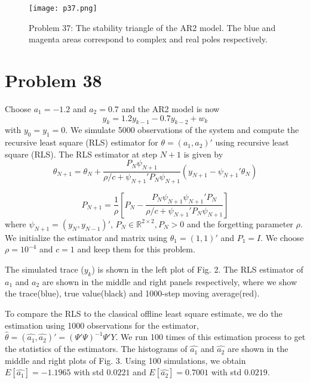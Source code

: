 \documentclass[a4paper, 11pt]{article}
\begin{document}
\begin{figure}
	\begin{center}
		\texttt{[image: p37.png]}
		\caption{Problem 37: The stability triangle of the AR2 model. The blue and magenta areas correspond to complex and real poles respectively.}
	\end{center}
\end{figure}



\section*{Problem 38}
Choose $a_1 = -1.2$ and $a_2=0.7$ and the AR2 model is now
\begin{equation}
y_k = 1.2y_{k-1} - 0.7y_{k-2} + w_k
\end{equation}
with $y_0 = y_1 = 0$. We simulate 5000 observations of the system and compute the recursive least square (RLS) estimator for $\theta = (a_1, a_2)'$ using recursive least square (RLS). The RLS estimator at step $N+1$ is given by  
\begin{equation}
\theta_{N+1} = \theta_N + \frac{P_N\psi_{N+1}}{\rho/c + \psi_{N+1}'P_N\psi_{N+1}}(y_{N+1} - \psi_{N+1}'\theta_N)
\end{equation}

\begin{equation}
P_{N+1} = \frac{1}{\rho}\left[P_N - \frac{P_N\psi_{N+1}\psi_{N+1}'P_N}{\rho/c + \psi_{N+1}'P_N\psi_{N+1}} \right]
\end{equation}
where $\psi_{N+1} = (y_N, y_{N-1})'$, $P_N \in \mathbb{R}^{2\times 2}, P_N >0$ and the forgetting parameter $\rho$. We initialize the estimator and matrix using $\theta_1 = (1, 1)'$ and $P_1 = I$. We choose $\rho = 10^{-4}$ and $c=1$ and keep them for this problem. 


The simulated trace ($y_k$) is shown in the left plot of Fig. 2. The RLS estimator of $a_1$ and $a_2$ are shown in the middle and right panels respectively, where we show the trace(blue), true value(black) and 1000-step moving average(red). 


To compare the RLS to the classical offline least square estimate, we do the estimation using 1000 observations for the estimator, $\hat{\theta} = (\hat{a_1}, \hat{a_2})' = (\Psi' \Psi)^{-1} \Psi' Y$. We run 100 times of this estimation process to get the statistics of the estimators. The histograms of $\hat{a_1}$ and $\hat{a_2}$ are shown in the middle and right plots of Fig. 3. Using 100 simulations, we obtain $E[\hat{a_1}] = -1.1965$ with std $0.0221$ and $E[\hat{a_2}] = 0.7001$ with std $0.0219$. 
\end{document}
